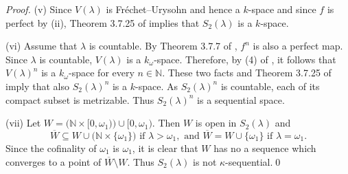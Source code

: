 \documentclass[preprint,11pt]{elsarticle}
\numberwithin{equation}{section}
\numberwithin{theorem}{section}
\newcommand{\w}{\omega}
\newcommand{\NN}{\mathbb{N}}
\newcommand{\SM}{{\setminus}}
\begin{document}
\begin{proof}

(v) Since $V(\lambda)$ is Fr\'{e}chet--Urysohn and hence a $k$-space and since $f$ is perfect by (ii), Theorem 3.7.25 of \cite{Eng} implies that  $S_2(\lambda)$ is  a $k$-space.

(vi) Assume that $\lambda$ is countable. By Theorem 3.7.7 of \cite{Eng}, $f^n$ is also a perfect map. Since $\lambda$ is countable, $V(\lambda)$ is a $k_\w$-space. Therefore, by (4) of \cite{Franklin-Smith}, it follows that  $V(\lambda)^n$ is a $k_\w$-space for every $n\in\NN$. These two facts and Theorem 3.7.25 of \cite{Eng} imply that also $S_2(\lambda)^n$ is a $k$-space. As $S_2(\lambda)^n$ is countable, each of its compact subset is metrizable. Thus $S_2(\lambda)^n$ is a sequential space.
%
%
%
%
%
\smallskip



(vii) Let $W=\big(\NN\times[0,\w_1)\big)\cup [0,\w_1)$. Then $W$ is open in $S_2(\lambda)$ and
\[
\overline{W}\subseteq W\cup\big(\NN\times\{\w_1\}\big) \mbox{ if } \lambda>\w_1, \mbox{ and } \overline{W}=W\cup\{\w_1\} \mbox{ if } \lambda=\w_1.
\]
Since the cofinality of $\w_1$ is $\w_1$, it is clear that $W$ has no a sequence which converges to a point of $\overline{W}\SM W$. Thus $S_2(\lambda)$  is not $\kappa$-sequential.\qed
\end{proof}
\end{document}
